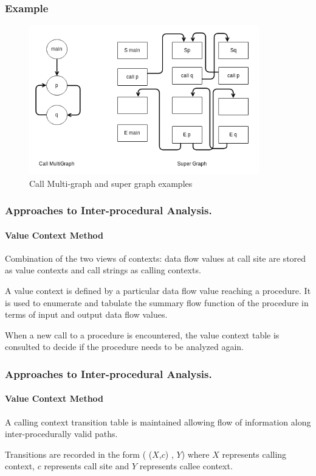 \documentclass{beamer}
\begin{document}
  \begin{frame}
  \frametitle{Example}
  		\begin{figure}[here]
  			\begin{center}
  				\includegraphics[width=10cm]{Figures/callgraph.png}
  			\end{center}
  			\caption{Call Multi-graph and super graph examples}
  			\label{fig:cmg_sg}
  		\end{figure}
  \end{frame}
  
  
  \begin{frame}
  \frametitle{Approaches to Inter-procedural Analysis.}
  \framesubtitle{Value Context Method}
  Combination of the two views of contexts: data flow values at call site are stored as value contexts and call strings as calling contexts. 
  \vspace{\baselineskip}
  
  A value context is defined by a particular data flow value reaching a procedure. It is used to enumerate and tabulate the summary flow function of the procedure in terms of input and output data flow values.  

  \vspace{\baselineskip}
  When a new call to a procedure is encountered, the value context table is consulted to decide if the procedure needs to be analyzed again.
  
  
  \end{frame}
  
  \begin{frame}
  \frametitle{Approaches to Inter-procedural Analysis.}
  \framesubtitle{Value Context Method}
	 A calling context transition table is maintained  allowing flow of information along inter-procedurally valid paths. 
	
	\vspace{\baselineskip}
	Transitions are recorded in the form ( ($X$,$c$) , $Y$) where $X$ represents calling context, $c$ represents call site and $Y$ represents callee context.
	
	\vspace{\baselineskip}
	 
	
  \end{frame}
  
\end{document}
